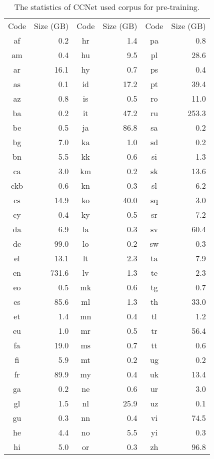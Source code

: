 \documentclass[11pt,a4paper]{article}
\begin{document}
\begin{table}[ht]
\centering
\scriptsize
\begin{tabular}{crcrcr}
\toprule
Code & Size (GB) & Code & Size (GB) & Code & Size (GB) \\ \cmidrule(r){1-2}\cmidrule{3-4}\cmidrule(l){5-6}
af & 0.2 & hr & 1.4 & pa & 0.8 \\
am & 0.4 & hu & 9.5 & pl & 28.6 \\
ar & 16.1 & hy & 0.7 & ps & 0.4 \\
as & 0.1 & id & 17.2 & pt & 39.4 \\
az & 0.8 & is & 0.5 & ro & 11.0 \\
ba & 0.2 & it & 47.2 & ru & 253.3 \\
be & 0.5 & ja & 86.8 & sa & 0.2 \\
bg & 7.0 & ka & 1.0 & sd & 0.2 \\
bn & 5.5 & kk & 0.6 & si & 1.3 \\
ca & 3.0 & km & 0.2 & sk & 13.6 \\
ckb & 0.6 & kn & 0.3 & sl & 6.2 \\
cs & 14.9 & ko & 40.0 & sq & 3.0 \\
cy & 0.4 & ky & 0.5 & sr & 7.2 \\
da & 6.9 & la & 0.3 & sv & 60.4 \\
de & 99.0 & lo & 0.2 & sw & 0.3 \\
el & 13.1 & lt & 2.3 & ta & 7.9 \\
en & 731.6 & lv & 1.3 & te & 2.3 \\
eo & 0.5 & mk & 0.6 & tg & 0.7 \\
es & 85.6 & ml & 1.3 & th & 33.0 \\
et & 1.4 & mn & 0.4 & tl & 1.2 \\
eu & 1.0 & mr & 0.5 & tr & 56.4 \\
fa & 19.0 & ms & 0.7 & tt & 0.6 \\
fi & 5.9 & mt & 0.2 & ug & 0.2 \\
fr & 89.9 & my & 0.4 & uk & 13.4 \\
ga & 0.2 & ne & 0.6 & ur & 3.0 \\
gl & 1.5 & nl & 25.9 & uz & 0.1 \\
gu & 0.3 & nn & 0.4 & vi & 74.5 \\
he & 4.4 & no & 5.5 & yi & 0.3 \\
hi & 5.0 & or & 0.3 & zh & 96.8 \\
\bottomrule
\end{tabular}
\caption{The statistics of CCNet used corpus for pre-training.}
\label{table:cc}
\end{table}
\end{document}
